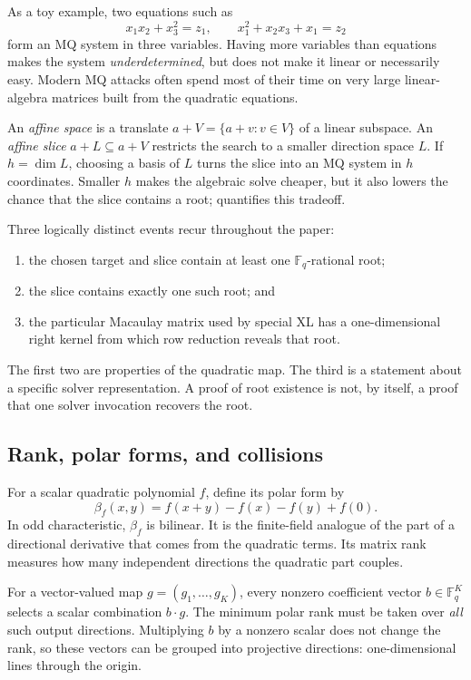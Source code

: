 \documentclass[11pt]{article}
\newcommand{\F}{\mathbb F}
\begin{document}
As a toy example, two equations such as
\[
 x_1x_2+x_3^2=z_1,
 \qquad
 x_1^2+x_2x_3+x_1=z_2
\]
form an MQ system in three variables.  Having more variables than equations
makes the system \emph{underdetermined}, but does not make it linear or
necessarily easy.  Modern MQ attacks often spend most of their time on very
large linear-algebra matrices built from the quadratic equations.

An \emph{affine space} is a translate $a+V=\{a+v:v\in V\}$ of a linear
subspace.  An \emph{affine slice} $a+L\subseteq a+V$ restricts the search to a
smaller direction space $L$.  If $h=\dim L$, choosing a basis of $L$ turns the
slice into an MQ system in $h$ coordinates.  Smaller $h$ makes the algebraic
solve cheaper, but it also lowers the chance that the slice contains a root;
 quantifies this tradeoff.

Three logically distinct events recur throughout the paper:
\begin{enumerate}[label=(\roman*),itemsep=2pt]
\item the chosen target and slice contain at least one $\F_q$-rational root;
\item the slice contains exactly one such root; and
\item the particular Macaulay matrix used by special XL has a one-dimensional
      right kernel from which row reduction reveals that root.
\end{enumerate}
The first two are properties of the quadratic map.  The third is a statement
about a specific solver representation.  A proof of root existence is not, by
itself, a proof that one solver invocation recovers the root.

\subsection{Rank, polar forms, and collisions}

For a scalar quadratic polynomial $f$, define its polar form by
\[
  \beta_f(x,y)=f(x+y)-f(x)-f(y)+f(0).
\]
In odd characteristic, $\beta_f$ is bilinear.  It is the finite-field analogue
of the part of a directional derivative that comes from the quadratic terms.
Its matrix rank measures how many independent directions the quadratic part
couples.

For a vector-valued map $g=(g_1,\ldots,g_K)$, every nonzero coefficient vector
$b\in\F_q^K$ selects a scalar combination $b\cdot g$.  The minimum polar rank
must be taken over \emph{all} such output directions.  Multiplying $b$ by a nonzero scalar does not change the rank, so these
vectors can be grouped into projective directions: one-dimensional lines
through the origin.
\end{document}
